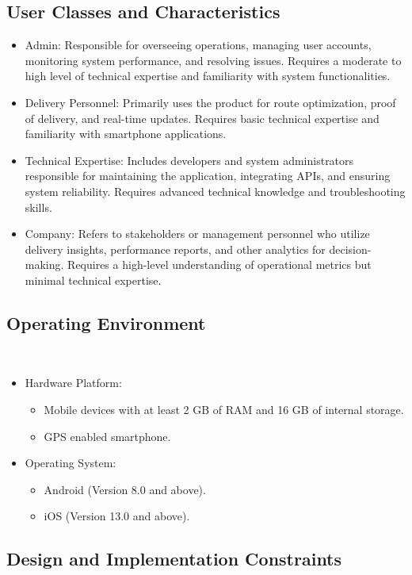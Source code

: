 \subsection{User Classes and Characteristics}

\begin{itemize}
    \item Admin: Responsible for overseeing operations, managing user accounts, monitoring system performance, and resolving issues. Requires a moderate to high level of technical expertise and familiarity with system functionalities.
    \item Delivery Personnel: Primarily uses the product for route optimization, proof of delivery, and real-time updates. Requires basic technical expertise and familiarity with smartphone applications.
    \item Technical Expertise: Includes developers and system administrators responsible for maintaining the application, integrating APIs, and ensuring system reliability. Requires advanced technical knowledge and troubleshooting skills.
    \item Company: Refers to stakeholders or management personnel who utilize delivery insights, performance reports, and other analytics for decision-making. Requires a high-level understanding of operational metrics but minimal technical expertise.
\end{itemize}

\subsection{Operating Environment}
\
\begin{itemize}
    \item Hardware Platform:
    \begin{itemize}
        \item Mobile devices with at least 2 GB of RAM and 16 GB of internal storage.
        \item GPS enabled smartphone.
    \end{itemize}
    \item Operating System:
    \begin{itemize}
        \item Android (Version 8.0 and above).
        \item iOS (Version 13.0 and above).
    \end{itemize}
\end{itemize}

\subsection{Design and Implementation Constraints}

